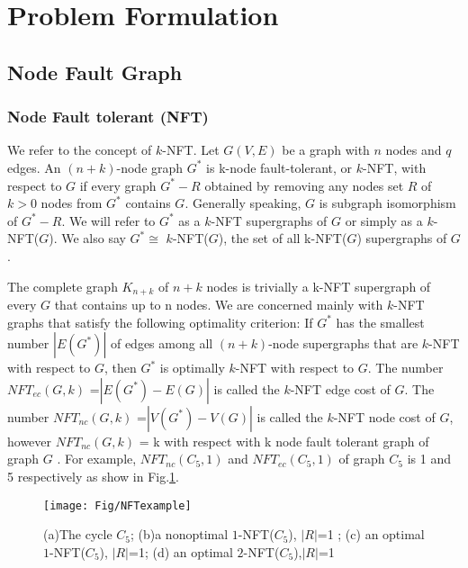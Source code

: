 
\section{Problem Formulation}
\label{sec:ProblemFormulation}


\subsection{Node Fault Graph}
\subsubsection{Node Fault tolerant (NFT)}
We refer to the concept of $k$-NFT\cite{harary1996node}. Let $G(V,E)$ be a graph with $n$ nodes and $q$ edges. An $(n+k)$-node graph $G^*$ is k-node fault-tolerant, or $k$-NFT, with respect to $G$ if every graph $G^*-R$ obtained by removing any nodes set $R$ of $k>0$ nodes from $G^*$ contains $G$. Generally speaking, $G$ is subgraph isomorphism of $G^*-R$. We will refer to $G^*$ as a $k$-NFT supergraphs of $G$ or simply as a $k$-NFT($G$). We also say $G^*\cong$ $k$-NFT($G$), the set of all k-NFT($G$) supergraphs of $G$.

The complete graph $K_{n+k}$ of $n + k$ nodes is trivially a k-NFT supergraph of every $G$ that contains up to n nodes. We are concerned mainly with $k$-NFT graphs that satisfy the following optimality criterion: If $G^*$ has the smallest number $|E(G^*)|$ of edges among all $(n + k)$-node supergraphs that are $k$-NFT with respect to $G$, then $G^*$ is optimally $k$-NFT with respect to $G$. The number $NFT_{ec}$$(G,k)$ =$|E(G^*)-E(G)|$ is called the $k$-NFT edge cost of $G$. The number $NFT_{nc}$$(G,k)$ =$|V(G^*)-V(G)|$ is called the $k$-NFT node cost of $G$, however $NFT_{nc}$$(G,k)$ = k with respect with k node fault tolerant graph of graph $G$ . For example, $NFT_{nc}$$(C_5,1)$ and $NFT_{ec}$$(C_5,1)$ of graph $C_5$ is 1 and 5 respectively as show in Fig.\ref{fig:NFTexample}.

\begin{figure}
  \centering
  \texttt{[image: Fig/NFTexample]}\\
  \caption{(a)The cycle $C_5$; (b)a nonoptimal $1$-NFT($C_5$), $|R|$=1 ; (c) an optimal $1$-NFT($C_5$), $|R|$=1; (d) an optimal $2$-NFT($C_5$),$|R|$=1 }\label{fig:NFTexample}
\end{figure}

